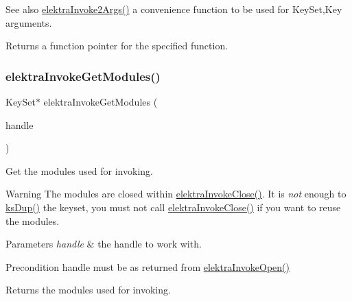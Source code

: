 \begin{DoxySeeAlso}{See also}
\hyperlink{group__invoke_gaa257d93399c60f73c611205bbfa7c9a0}{elektra\+Invoke2\+Args()} a convenience function to be used for Key\+Set,Key arguments.
\end{DoxySeeAlso}
\begin{DoxyReturn}{Returns}
a function pointer for the specified function. 
\end{DoxyReturn}
\mbox{\label{group__invoke_gaf3564011b52e96c9754a7b9bc41ea478}} 
\subsubsection{\texorpdfstring{elektra\+Invoke\+Get\+Modules()}{elektraInvokeGetModules()}}
{\footnotesize\ttfamily Key\+Set$\ast$ elektra\+Invoke\+Get\+Modules (\begin{DoxyParamCaption}\item[{Elektra\+Invoke\+Handle $\ast$}]{handle }\end{DoxyParamCaption})}



Get the modules used for invoking. 

\begin{DoxyWarning}{Warning}
The modules are closed within \hyperlink{group__invoke_ga511b84e5cea7dbd2b23c4da5c8ff5ae3}{elektra\+Invoke\+Close()}. It is {\itshape not} enough to \hyperlink{group__keyset_gac59e4b328245463f1451f68d5106151c}{ks\+Dup()} the keyset, you must not call \hyperlink{group__invoke_ga511b84e5cea7dbd2b23c4da5c8ff5ae3}{elektra\+Invoke\+Close()} if you want to reuse the modules.
\end{DoxyWarning}

\begin{DoxyParams}{Parameters}
{\em handle} & the handle to work with.\\
\hline
\end{DoxyParams}
\begin{DoxyPrecond}{Precondition}
handle must be as returned from \hyperlink{group__invoke_ga3fd9791ecf43c0dde08a2fc1f02db6bc}{elektra\+Invoke\+Open()}
\end{DoxyPrecond}
\begin{DoxyReturn}{Returns}
the modules used for invoking. 
\end{DoxyReturn}
\mbox{\label{group__invoke_gafc090b80f3ba846bf3c3fd8ccd34f2f5}} 
